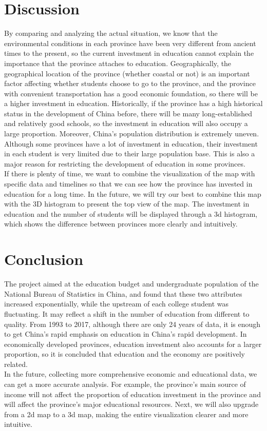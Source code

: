 \section{Discussion}
By comparing and analyzing the actual situation, we know that the environmental conditions in each province have been very different from ancient times to the present, so the current investment in education cannot explain the importance that the province attaches to education. Geographically, the geographical location of the province (whether coastal or not) is an important factor affecting whether students choose to go to the province, and the province with convenient transportation has a good economic foundation, so there will be a higher investment in education. Historically, if the province has a high historical status in the development of China before, there will be many long-established and relatively good schools, so the investment in education will also occupy a large proportion. Moreover, China's population distribution is extremely uneven. Although some provinces have a lot of investment in education, their investment in each student is very limited due to their large population base. This is also a major reason for restricting the development of education in some provinces.\\

\noindent If there is plenty of time, we want to combine the visualization of the map with specific data and timelines so that we can see how the province has invested in education for a long time. In the future, we will try our best to combine this map with the 3D histogram to present the top view of the map. The investment in education and the number of students will be displayed through a 3d histogram, which shows the difference between provinces more clearly and intuitively.

\section{Conclusion}
\label{sec:conclusion}

The project aimed at the education budget and undergraduate population of the National Bureau of Statistics in China, and found that these two attributes increased exponentially, while the upstream of each college student was fluctuating. It may reflect a shift in the number of education from different to quality. From 1993 to 2017, although there are only 24 years of data, it is enough to get China's rapid emphasis on education in China's rapid development. In economically developed provinces, education investment also accounts for a larger proportion, so it is concluded that education and the economy are positively related.\\

\noindent In the future, collecting more comprehensive economic and educational data, we can get a more accurate analysis. For example, the province’s main source of income will not affect the proportion of education investment in the province and will affect the province’s major educational resources. Next, we will also upgrade from a 2d map to a 3d map, making the entire visualization clearer and more intuitive. 
